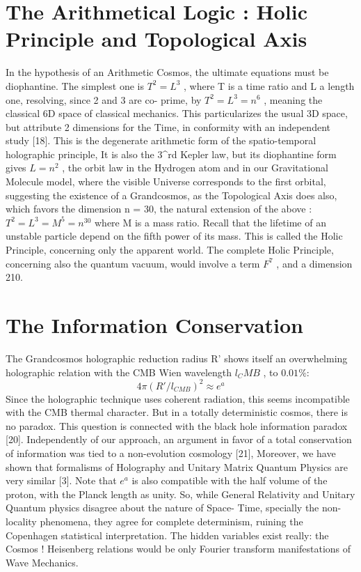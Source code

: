 \section {The Arithmetical Logic : Holic Principle and Topological Axis}

In the hypothesis of an Arithmetic Cosmos, the ultimate equations must be diophantine. The
simplest one is $T^{2} = L^{3}$ , where T is a time ratio and L a length one, resolving, since 2 and 3 are co-
prime, by $T^{2} = L^{3} = n^{6}$ , meaning the classical 6D space of classical mechanics. This particularizes
the usual 3D space, but attribute 2 dimensions for the Time, in conformity with an independent
study [18].
This is the degenerate arithmetic form of the spatio-temporal holographic principle, It is also the
3^{rd} Kepler law, but its diophantine form gives $L = n^{2}$ , the orbit law in the Hydrogen atom and in our
Gravitational Molecule model, where the visible Universe corresponds to the first orbital,
suggesting the existence of a Grandcosmos, as the Topological Axis does also, which favors the
dimension n = 30, the natural extension of the above :
$T^{2} = L^{3} = M^{5} = n^{30}$ where M is a mass ratio. Recall that the lifetime of an unstable particle depend on the fifth power of its mass. This is called the Holic Principle, concerning only the apparent world. The complete Holic
Principle, concerning also the quantum vacuum, would involve a term $F^{7}$ , and a dimension 210.

\section {The Information Conservation}

The Grandcosmos holographic reduction radius R' shows itself an overwhelming holographic
relation with the CMB Wien wavelength $l_CMB$ , to $0.01\%$:
$$4\pi(R\prime/l_{CMB} )^{2} ≈ e^{a}$$
Since the holographic technique uses coherent radiation, this seems incompatible with the CMB
thermal character. But in a totally deterministic cosmos, there is no paradox. This question is
connected with the black hole information paradox [20]. Independently of our approach, an
argument in favor of a total conservation of information was tied to a non-evolution cosmology
[21], Moreover, we have shown that formalisms of Holography and Unitary Matrix Quantum
Physics are very similar [3]. Note that $e^{a}$ is also compatible with the half volume of the proton, with
the Planck length as unity.
So, while General Relativity and Unitary Quantum physics disagree about the nature of Space-
Time, specially the non-locality phenomena, they agree for complete determinism, ruining the
Copenhagen statistical interpretation. The hidden variables exist really: the Cosmos ! Heisenberg
relations would be only Fourier transform manifestations of Wave Mechanics.

